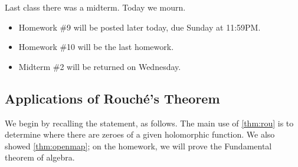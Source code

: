 \documentclass[../notes.tex]{subfiles}
\begin{document}

Last class there was a midterm. Today we mourn.
\begin{itemize}
	\item Homework \#9 will be posted later today, due Sunday at 11:59PM.
	\item Homework \#10 will be the last homework.
	\item Midterm \#2 will be returned on Wednesday.
\end{itemize}

\subsection{Applications of Rouch\'e's Theorem}
We begin by recalling the statement, as follows.
\routhm*
\noindent The main use of \autoref{thm:rou} is to determine where there are zeroes of a given holomorphic function. We also showed \autoref{thm:openmap}; on the homework, we will prove the Fundamental theorem of algebra.
\end{document}
